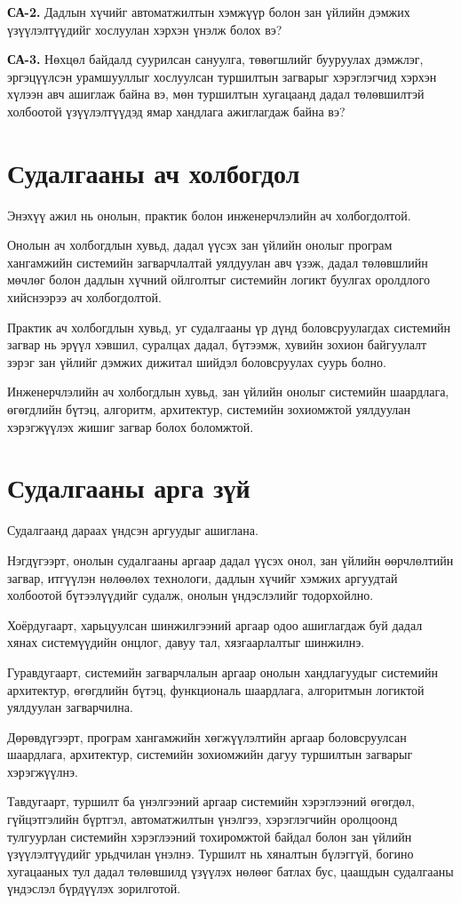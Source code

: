\textbf{СА-2.} Дадлын хүчийг автоматжилтын хэмжүүр болон зан үйлийн дэмжих үзүүлэлтүүдийг хослуулан хэрхэн үнэлж болох вэ?

\textbf{СА-3.} Нөхцөл байдалд суурилсан сануулга, төвөгшлийг бууруулах дэмжлэг, эргэцүүлсэн урамшууллыг хослуулсан туршилтын загварыг хэрэглэгчид хэрхэн хүлээн авч ашиглаж байна вэ, мөн туршилтын хугацаанд дадал төлөвшилтэй холбоотой үзүүлэлтүүдэд ямар хандлага ажиглагдаж байна вэ?

\section{Судалгааны ач холбогдол}

Энэхүү ажил нь онолын, практик болон инженерчлэлийн ач холбогдолтой.

Онолын ач холбогдлын хувьд, дадал үүсэх зан үйлийн онолыг програм хангамжийн системийн загварчлалтай уялдуулан авч үзэж, дадал төлөвшлийн мөчлөг болон дадлын хүчний ойлголтыг системийн логикт буулгах оролдлого хийснээрээ ач холбогдолтой.

Практик ач холбогдлын хувьд, уг судалгааны үр дүнд боловсруулагдах системийн загвар нь эрүүл хэвшил, суралцах дадал, бүтээмж, хувийн зохион байгуулалт зэрэг зан үйлийг дэмжих дижитал шийдэл боловсруулах суурь болно.

Инженерчлэлийн ач холбогдлын хувьд, зан үйлийн онолыг системийн шаардлага, өгөгдлийн бүтэц, алгоритм, архитектур, системийн зохиомжтой уялдуулан хэрэгжүүлэх жишиг загвар болох боломжтой.

\section{Судалгааны арга зүй}

Судалгаанд дараах үндсэн аргуудыг ашиглана.

Нэгдүгээрт, онолын судалгааны аргаар дадал үүсэх онол, зан үйлийн өөрчлөлтийн загвар, итгүүлэн нөлөөлөх технологи, дадлын хүчийг хэмжих аргуудтай холбоотой бүтээлүүдийг судалж, онолын үндэслэлийг тодорхойлно.

Хоёрдугаарт, харьцуулсан шинжилгээний аргаар одоо ашиглагдаж буй дадал хянах системүүдийн онцлог, давуу тал, хязгаарлалтыг шинжилнэ.

Гуравдугаарт, системийн загварчлалын аргаар онолын хандлагуудыг системийн архитектур, өгөгдлийн бүтэц, функциональ шаардлага, алгоритмын логиктой уялдуулан загварчилна.

Дөрөвдүгээрт, програм хангамжийн хөгжүүлэлтийн аргаар боловсруулсан шаардлага, архитектур, системийн зохиомжийн дагуу туршилтын загварыг хэрэгжүүлнэ.

Тавдугаарт, туршилт ба үнэлгээний аргаар системийн хэрэглээний өгөгдөл, гүйцэтгэлийн бүртгэл, автоматжилтын үнэлгээ, хэрэглэгчийн оролцоонд тулгуурлан системийн хэрэглээний тохиромжтой байдал болон зан үйлийн үзүүлэлтүүдийг урьдчилан үнэлнэ. Туршилт нь хяналтын бүлэггүй, богино хугацааных тул дадал төлөвшилд үзүүлэх нөлөөг батлах бус, цаашдын судалгааны үндэслэл бүрдүүлэх зорилготой.